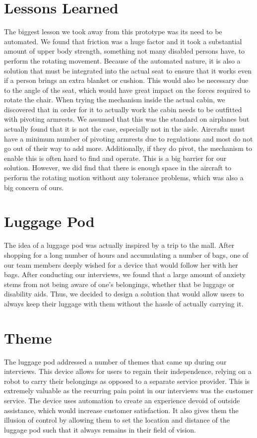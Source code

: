 \documentclass[a4paper, 12pt,conference]{new_cit_thesis}
\begin{document}
\section*{Lessons Learned}
The biggest lesson we took away from this prototype was its need to be automated. We found that friction was a huge factor and it took a substantial amount of upper body strength, something not many disabled persons have, to perform the rotating movement. Because of the automated nature, it is also a solution that must be integrated into the actual seat to ensure that it works even if a person brings an extra blanket or cushion. This would also be necessary due to the angle of the seat, which would have great impact on the forces required to rotate the chair. When trying the mechanism inside the actual cabin, we discovered that in order for it to actually work the cabin needs to be outfitted with pivoting armrests. We assumed that this was the standard on airplanes but actually found that it is not the case, especially not in the aisle. Aircrafts must have a minimum number of pivoting armrests due to regulations and most do not go out of their way to add more. Additionally, if they do pivot, the mechanism to enable this is often hard to find and operate. This is a big barrier for our solution. However, we did find that there is enough space in the aircraft to perform the rotating motion without any tolerance problems, which was also a big concern of ours. 

\section{Luggage Pod}
The idea of a luggage pod was actually inspired by a trip to the mall. After shopping for a long number of hours and accumulating a number of bags, one of our team members deeply wished for a device that would follow her with her bags. After conducting our interviews, we found that a large amount of anxiety stems from not being aware of one’s belongings, whether that be luggage or disability aids. Thus, we decided to design a solution that would allow users to always keep their luggage with them without the hassle of actually carrying it.

\section*{Theme}
The luggage pod addressed a number of themes that came up during our interviews. This device allows for users to regain their independence, relying on a robot to carry their belongings as opposed to a separate service provider. This is extremely valuable as the recurring pain point in our interviews was the customer service. The device uses automation to create an experience devoid of outside assistance, which would increase customer satisfaction. It also gives them the illusion of control by allowing them to set the location and distance of the luggage pod such that it always remains in their field of vision. 
\end{document}
